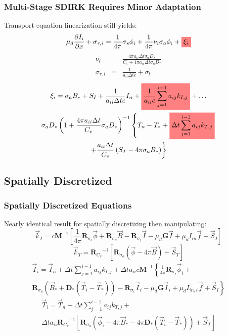 \documentclass{beamer}
\newcommand{\highlight}[1]{%
  \colorbox{red!50}{$\displaystyle#1$}}
\newcommand{\be}{\begin{equation*}}   %
\newcommand{\ee}{\end{equation*}}
\newcommand{\bea}{\begin{eqnarray*}}  %
\newcommand{\eea}{\end{eqnarray*}}
\newcommand{\R}[1]{\ensuremath{\mathbf{R}_{#1}}}
\newcommand{\D}{\ensuremath{ \mathbf{D}_* }}
\newcommand{\M}{\ensuremath{ \mathbf M}}
\begin{document}
\begin{frame}
\frametitle{Multi-Stage SDIRK Requires Minor Adaptation}
Transport equation linearization still yields:\
\be
\mu_d \frac{\partial I_i}{\partial x} + \sigma_{\tau,i} = \frac{1}{4\pi} \sigma_s \phi_i + \frac{1}{4\pi}\nu_i \sigma_a \phi_i + \highlight{ \xi_i} 
\ee
\vspace{-0.2in}
\small
\bea
\nu_i &=&  \frac{ 4\pi a_{ii} \Delta t \sigma_a D_*}{C_v + 4\pi a_{ii} \Delta t  \sigma_a D_*} \\
\sigma_{\tau,i} &=& \frac{1}{a_{ii} \Delta t c} + \sigma_t
\eea
\vspace{-0.2in}
\begin{multline*}
\xi_i = \sigma_a B_* + S_I +  \frac{1}{a_{ii} \Delta t c} I_n + \highlight{ \frac{1}{a_{ii} c} \sum_{j=1}^{i-1}{a_{ij} k_{I,j}} }  + \dots  \\ 
\sigma_a D_*\left(1 + \frac{4\pi a_{ii} \Delta t}{C_v} \sigma_a D_*  \right)^{-1} 
\left \{ T_n - T_* + \highlight{ \Delta t \sum_{j=1}^{i-1}{a_{ij} k_{T,j}} } \right. \\
\left. +   \frac{a_{ii} \Delta t }{C_v}  \left( S_T -  4\pi  \sigma_a B_*   \right) \right \}
\end{multline*}
\end{frame}

\subsection{Spatially Discretized}
\begin{frame}
\frametitle{Spatially Discretized Equations}
Nearly identical result for spatially discretizing then manipulating:
\be
\vec{k}_{I}= c \M^{-1} 
\left[
\frac{1}{4\pi}\R{\sigma_s}\vec{\phi} + \R{\sigma_a}\vec{B} - \R{\sigma_t} \vec{I} - \mu_d\mathbf{G}\vec{I} + \mu_d I_{in} \vec{f}+ \vec{S}_I
\right]
\ee
\be
\vec{k}_T =  \R{C_v}^{-1}
\left[ \R{\sigma_a} \left(\vec{\phi} - 4\pi\vec{B} \right) + \vec{S}_T \right] 
\ee
\vspace{-0.1in}
\begin{multline*}
\vec{I}_i = \vec{I}_n + \Delta t \sum_{j=1}^{i-1}{a_{ij} k_{I,j}   } + 
\Delta t a_{ii} c \M^{-1}\left \{ \frac{1}{4\pi}\R{\sigma_s}\vec{\phi}_i + \right. \\
\left. \R{\sigma_a}\left(\vec{B}_* + \D \left(\vec{T}_i -\vec{T}_*  \right)   \right)- \R{\sigma_t} \vec{I}_i - \mu_d \mathbf{G}\vec{I}_i + \mu_d I_{in,i} \vec{f}+ \vec{S}_I
\right\}
\end{multline*}
\vspace{-0.1in}
\begin{multline*}
\vec{T}_i = \vec{T}_n + \Delta t \sum_{j=1}^{i-1}{a_{ij} k_{T,j}   } + \\
\Delta t a_{ii}\R{C_v}^{-1}\left[
\R{\sigma_a}\left(\vec{\phi}_i - 4\pi\vec{B}_* - 4\pi\D\left( \vec{T}_i - \vec{T}_* \right)\right) + \vec{S}_T 
\right] 
\end{multline*}

\end{frame}
\end{document}

